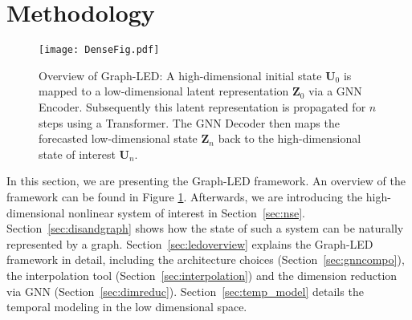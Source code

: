 \documentclass{article}
\begin{document}
\section{Methodology}
\begin{figure}[t]
    \centering
    \texttt{[image: DenseFig.pdf]}
    \caption{Overview of Graph-LED: A high-dimensional initial state $\boldsymbol{U}_0$ is mapped to a low-dimensional latent representation $\boldsymbol{Z}_0$ via a GNN Encoder. Subsequently this latent representation is propagated for $n$ steps using a Transformer. The GNN Decoder then maps the forecasted low-dimensional state $\boldsymbol{Z}_n$  back to the high-dimensional state of interest $\boldsymbol{U}_n$.}
    \label{fig:overview}
\end{figure}
In this section, we are presenting the Graph-LED framework. An overview of the framework can be found in Figure \ref{fig:overview}. Afterwards, we are introducing the high-dimensional nonlinear system of interest in  Section~\ref{sec:nse}. Section~\ref{sec:disandgraph} shows how the state of such a system can be naturally represented by a graph. Section~\ref{sec:ledoverview} explains the Graph-LED framework in detail, including the architecture choices (Section~\ref{sec:gnncompo}), the interpolation tool (Section~\ref{sec:interpolation}) and the dimension reduction via GNN (Section~\ref{sec:dimreduc}). Section~\ref{sec:temp_model} details the temporal modeling in the low dimensional space.
\end{document}
